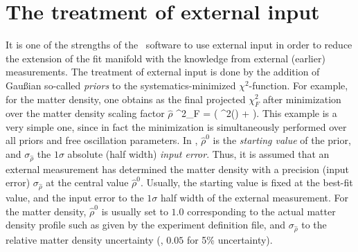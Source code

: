 \section{The treatment of external input}
\label{sec:externalinput}

It is one of the strengths of the \GLOBES\ software to use external input 
in order to reduce the extension of the fit manifold with the knowledge 
from external
(earlier) measurements. The treatment of external input is done by the 
addition of Gau\ss ian so-called {\em priors} to the systematics-minimized 
$\chi^2$-function. For example, for the matter density, one obtains as the 
final projected $\chi^2_F$ after minimization over the matter density
scaling factor  $\hat{\rho}$
\be
 \chi^2_F =  \left( \chi^2(\hat{\rho}) +
  \right).
\label{equ:priors}
\ee
This example is a very simple one, since in fact the
minimization is simultaneously performed over all priors and free oscillation 
parameters. In , $\hat{\rho}^0$ is the {\em starting value} of the 
prior, and $\sigma_{\hat{\rho}}$ the $1 \sigma$ absolute (half width) 
{\em input error}. Thus, it is assumed that an external measurement has 
determined the matter density with a precision (input error) 
$\sigma_{\hat{\rho}}$ at the central value $\hat{\rho}^0$. Usually, 
the starting value is fixed at the best-fit value, and the input error 
to the $1 \sigma$ half width of the external measurement. For the matter 
density, $\hat{\rho}^0$  is usually set to $1.0$ corresponding to
the actual matter density profile such as given by the experiment
 definition file, and $\sigma_{\hat{\rho}}$ to the 
relative matter density uncertainty (\eg, $0.05$ for 5\% uncertainty).

